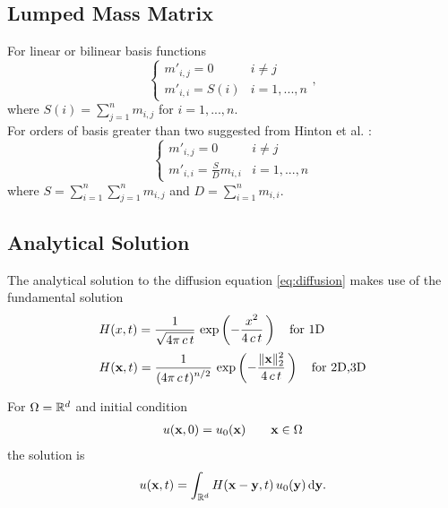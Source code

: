 \subsection{Lumped Mass Matrix}
For linear or bilinear basis functions
\begin{equation*}
\left\{
  \begin{array}{ll}
    m'_{i,j}=0 &i\ne j\\
    m'_{i,i}=S(i) &i=1,...,n
  \end{array},
\right.
\end{equation*}
where $S(i)=\sum_{j=1}^{n}m_{i,j}$ for $i=1,...,n$.\\[0.5em]
For orders of basis greater than two suggested from Hinton et al. \cite{hinton_rock_zienkiewicz_1976}:
\begin{equation}
\left\{
  \begin{array}{ll}
	m'_{i,j}=0 &i\ne j\\
	m'_{i,i}=\frac{S}{D} m_{i,i} & i=1,...,n
  \end{array}
\right.
\end{equation}
where $S=\sum_{i=1}^{n}\sum_{j=1}^{n} m_{i,j}$ and $D=\sum_{i=1}^{n}m_{i,i}$.


\subsection{Analytical Solution}
The analytical solution to the diffusion equation \eqref{eq:diffusion} makes use of the fundamental solution
\begin{equation*}
  \begin{array}{lll}
    H(x,t) = \displaystyle\frac{\displaystyle{1}}{\displaystyle{\sqrt{4\pi\,c\,t}}}\,\exp\left(-\displaystyle\frac{\displaystyle{x^2}}{\displaystyle{4\,c\,t}}\,\right) \quad \text{for 1D}\\[4mm]
    H(\textbf{x},t) = \displaystyle\frac{\displaystyle{1}}{\displaystyle{(4\pi\,c\,t)^{n/2}}}\,\exp\left(-\displaystyle\frac{\displaystyle{\Vert \textbf{x}\Vert_2^2}}{\displaystyle{4\,c\,t}}\,\right) \quad \text{for 2D,3D}\\[4mm]
  \end{array}
\end{equation*}
For $\Omega=\mathbb{R}^d$ and initial condition
\begin{equation*}
  \begin{array}{lll}
    u(\textbf{x},0) = u_0(\textbf{x})\qquad \textbf{x} \in \Omega
  \end{array}
\end{equation*}
the solution is
\begin{equation*}
  \begin{array}{lll}
    u(\bfx,t) = \ds\int_{\R^d} H(\bfx - \bfy,t)\,u_0(\bfy)\,\d \bfy.
  \end{array}
\end{equation*}

